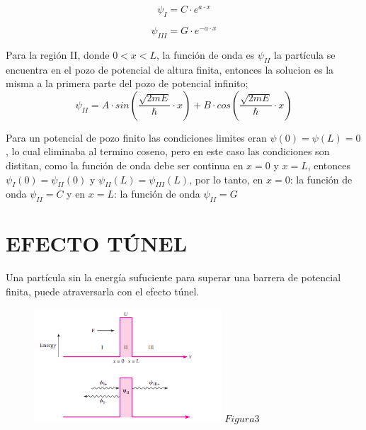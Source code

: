 \documentclass[a4paper]{article}
\begin{document}
            \begin{equation}
                \psi_I = C \cdot e^{a \cdot x}
            \end{equation}

            \begin{equation}
                \psi_{III} = G \cdot e^{-a \cdot x} 
            \end{equation}

            \indent Para la región II, donde $0 < x < L$, la función de onda es $\psi_{II}$
            la partícula se encuentra en el pozo de potencial de altura finita, entonces la solucion es la misma a la primera parte del pozo de potencial infinito;\\

            \begin{equation}
                \psi_{II} = A \cdot sin(\frac{\sqrt{2mE}}{\hbar} \cdot x) + B \cdot cos(\frac{\sqrt{2mE}}{\hbar} \cdot x)
            \end{equation}

            \indent Para un potencial de pozo finito las condiciones limites eran $\psi(0) = \psi(L) = 0$, lo cual eliminaba al termino coseno, pero en este caso las condiciones son distitan, como la función de onda debe ser continua en $x = 0$ y $x = L$, entonces $\psi_I(0) = \psi_{II}(0)$ y $\psi_{II}(L) = \psi_{III}(L)$, por lo tanto, en $x = 0$: la función de onda $\psi_{II} = C$ y en $x = L$: la función de onda $\psi_{II} = G$

    \section{EFECTO TÚNEL}

            \indent Una partícula sin la energía sufuciente para superar una barrera de potencial finita, puede atraversarla con el efecto túnel.\\

            \saltoPag

            \begin{figure}[h!]
                \centering
                \includegraphics[width=7cm]{../../imagenes/efecto_tunel.png}
                \vspace{-0.5mm}
                \textbf{$Figura 3$}
            \end{figure}
\end{document}
